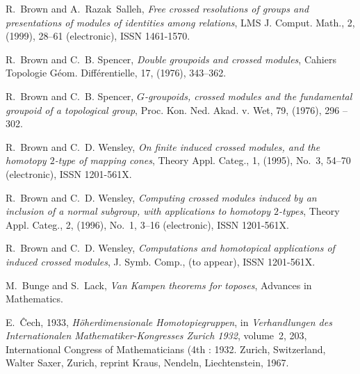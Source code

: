 \documentclass[12pt]{article}
\theoremstyle{definition}
\theoremstyle{remark}
\numberwithin{equation}{subsection}
\begin{document}
\begin{thebibliography}{99}
R.~Brown and A.~Razak~Salleh, {\em Free crossed resolutions of
groups and presentations of modules of identities among relations}, LMS J. Comput.  Math., %
2, (1999), 28--61 (electronic), ISSN 1461-1570.

R.~Brown and C.~B. Spencer, {\em Double groupoids and crossed
modules\/}, Cahiers Topologie G\'eom. Diff\'erentielle, 17, (1976), 343--362.

R.~Brown and C.~B. Spencer, {\em $G$-groupoids, crossed modules
and the fundamental groupoid of a topological group}, Proc. Kon. Ned. Akad. v. Wet,
  79, (1976), 296 -- 302.

R.~Brown and C.~D. Wensley, {\em On finite induced crossed
modules, and the homotopy {$2$}-type of mapping cones}, Theory Appl. Categ., 1, (1995), No.\
  3, 54--70 (electronic), ISSN 1201-561X.

R.~Brown and C.~D. Wensley, {\em Computing crossed modules induced
by an inclusion of a normal subgroup, with applications to homotopy {$2$}-types\/},
  Theory Appl. Categ., 2, (1996), No.\ 1, 3--16 (electronic), ISSN 1201-561X.

R.~Brown and C.~D. Wensley, {\em Computations and homotopical
applications of induced crossed modules\/}, J. Symb. Comp.,  (to appear), ISSN 1201-561X.

M.~Bunge and S.~Lack, {\em Van Kampen theorems for toposes}, Advances in Mathematics.

E.~{{\^C}}ech, 1933, {\em H{\"o}herdimensionale
{H}omotopiegruppen\/}, in {\em   Verhandlungen des Internationalen Mathematiker-Kongresses Zurich 1932\/},
volume~2,  203, International Congress of Mathematicians (4th : 1932. Zurich, Switzerland, Walter Saxer, 
Zurich, reprint Kraus, Nendeln, Liechtenstein, 1967.
\end{thebibliography}


\end{document}
